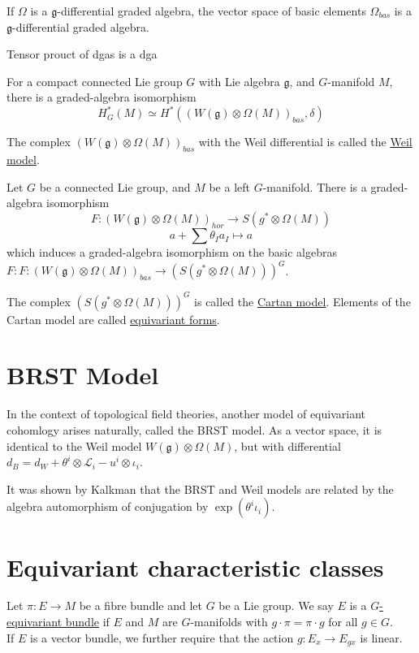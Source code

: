 \begin{prop} %
	If $\Omega$ is a  $\mathfrak{g}$-differential graded algebra, the vector
	space of basic elements $\Omega_{bas}$ is a $\mathfrak{g}$-differential
	graded algebra.
\end{prop}
Tensor prouct of dgas is a dga

\begin{thm} %
	For a compact connected Lie group $G$ with Lie algebra $\mathfrak{g}$, and
	$G$-manifold  $M$, there is a graded-algebra isomorphism 
	 \[
		 H_G^*(M) \simeq H^*((W(\mathfrak{g})\otimes \Omega(M))_{bas}, \delta)
	\] 
\end{thm}
The complex $(W(\mathfrak{g})\otimes \Omega(M))_{bas}$ with the Weil
differential is called the \underline{Weil model}.

\begin{thm} %
	Let $G$ be a connected Lie group, and $M$ be a left $G$-manifold. There is a
	graded-algebra isomorphism 
	\[
		F : (W(\mathfrak{g})\otimes \Omega(M))_{hor} \to S(g^*\otimes \Omega(M))
	\] 
	\[
	a+ \sum \theta_I a_I \mapsto a
	\] 
	which induces a graded-algebra isomorphism on the basic algebras
	$F : F : (W(\mathfrak{g})\otimes \Omega(M))_{bas} \to (S(g^*\otimes
	\Omega(M)))^G$. 
\end{thm}
The complex $(S(g^*\otimes \Omega(M)))^G$ is called the \underline{Cartan
model}. Elements of the Cartan model are called \underline{equivariant forms}.

\section{BRST Model}
In the context of topological field theories, another model of equivariant
cohomlogy arises naturally, called the BRST model. As a vector space, it is
identical to the Weil model $W(\mathfrak{g})\otimes \Omega(M)$, but with
differential $d_B = d_W + \theta^i\otimes \mathcal{L}_i - u^i \otimes \iota_i$.

It was shown by Kalkman that the BRST and Weil models are related by the algebra
automorphism of conjugation by $\exp (\theta^i \iota_i)$. 


\section{Equivariant characteristic classes}
\begin{defn} %
	Let $\pi: E\to M$ be a fibre bundle and let $G$ be a Lie group. We say $E$
	is a \underline{$G$-equivariant bundle} if $E$ and  $M$ are 
	$G$-manifolds  with $g \cdot \pi = \pi \cdot g$ for all  $g\in G$.\\
	If  $E$ is a vector bundle, we further require that the action  $g: E_x \to
	E_{gx}$ is linear.
\end{defn}

